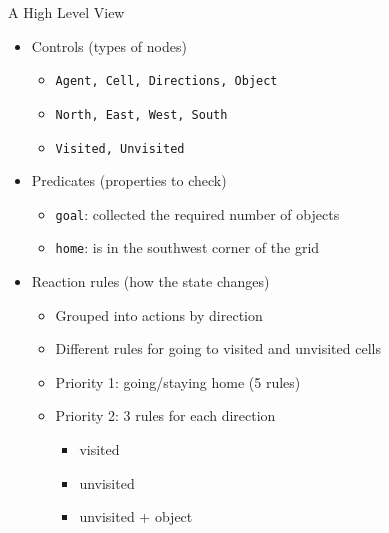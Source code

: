 \documentclass{beamer}
\begin{document}
\begin{frame}{A High Level View}
  \begin{itemize}
  \item Controls (types of nodes)
    \pause
    \begin{itemize}
    \item \texttt{Agent, Cell, Directions, Object}
      \pause
    \item \texttt{North, East, West, South}
      \pause
    \item \texttt{Visited, Unvisited}
    \end{itemize}
    \pause
  \item Predicates (properties to check)
    \begin{itemize}
    \item \texttt{goal}: collected the required number of objects
    \item \texttt{home}: is in the southwest corner of the grid
    \end{itemize}
    \pause
  \item Reaction rules (how the state changes)
    \pause
    \begin{itemize}
    \item Grouped into \alert{actions} by direction
    \item Different rules for going to visited and unvisited cells
      \pause
    \item Priority 1: going/staying home (5 rules)
      \pause
    \item Priority 2: 3 rules for each direction
      \begin{itemize}
      \item visited
      \item unvisited
      \item unvisited + object
      \end{itemize}
    \end{itemize}
  \end{itemize}
\end{frame}
\end{document}
